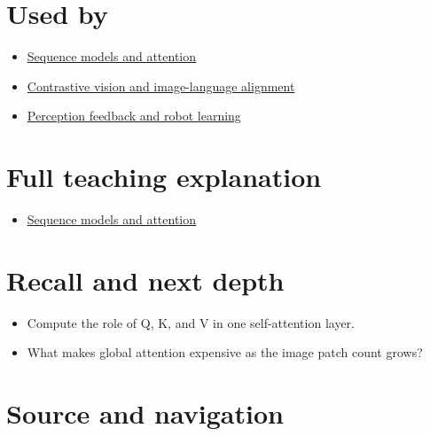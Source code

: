 \section{Used by}\label{appendix-a9d5dfdd164a-used-by}

\begin{itemize}
\tightlist
\item
  \href{Continuous\%20Notes/University\%20-\%20Worlds,\%20Images\%20and\%20Inference\%20-\%20Graphics,\%20Vision\%20and\%20Photography\#Sequence\%20models\%20and\%20attention}{Sequence models and attention}
\item
  \hyperref[appendix-772f1fd96148]{Contrastive vision and image-language alignment}
\item
  \hyperref[appendix-b0c42da325f1]{Perception feedback and robot learning}
\end{itemize}

\section{Full teaching explanation}\label{appendix-a9d5dfdd164a-full-teaching-explanation}

\begin{itemize}
\tightlist
\item
  \href{Continuous\%20Notes/University\%20-\%20Worlds,\%20Images\%20and\%20Inference\%20-\%20Graphics,\%20Vision\%20and\%20Photography\#Sequence\%20models\%20and\%20attention}{Sequence models and attention}
\end{itemize}

\section{Recall and next depth}\label{appendix-a9d5dfdd164a-recall-and-next-depth}

\begin{itemize}
\tightlist
\item
  Compute the role of Q, K, and V in one self-attention layer.
\item
  What makes global attention expensive as the image patch count grows?
\end{itemize}

\section{Source and navigation}\label{appendix-a9d5dfdd164a-source-and-navigation}

